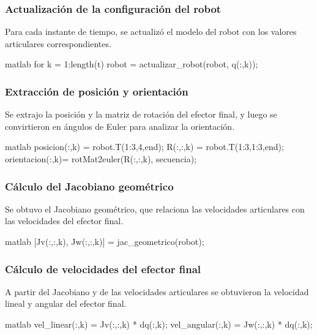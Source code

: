 \subsubsection*{Actualización de la configuración del robot}

Para cada instante de tiempo, se actualizó el modelo del robot con los valores articulares correspondientes.

\begin{matlabcode}{matlab}
	for k = 1:length(t)
	robot = actualizar_robot(robot, q(:,k));
\end{matlabcode}

\subsubsection*{Extracción de posición y orientación}

Se extrajo la posición y la matriz de rotación del efector final, y luego se convirtieron en ángulos de Euler para analizar la orientación.

\begin{matlabcode}{matlab}
	posicion(:,k)   = robot.T(1:3,4,end);
	R(:,:,k)        = robot.T(1:3,1:3,end);
	orientacion(:,k)= rotMat2euler(R(:,:,k), secuencia);
\end{matlabcode}

\subsubsection*{Cálculo del Jacobiano geométrico}

Se obtuvo el Jacobiano geométrico, que relaciona las velocidades articulares con las velocidades del efector final.

\begin{matlabcode}{matlab}
	[Jv(:,:,k), Jw(:,:,k)] = jac_geometrico(robot);
\end{matlabcode}

\subsubsection*{Cálculo de velocidades del efector final}

A partir del Jacobiano y de las velocidades articulares se obtuvieron la velocidad lineal y angular del efector final.

\begin{matlabcode}{matlab}
	vel_linear(:,k)  = Jv(:,:,k) * dq(:,k);
	vel_angular(:,k) = Jw(:,:,k) * dq(:,k);
\end{matlabcode}

